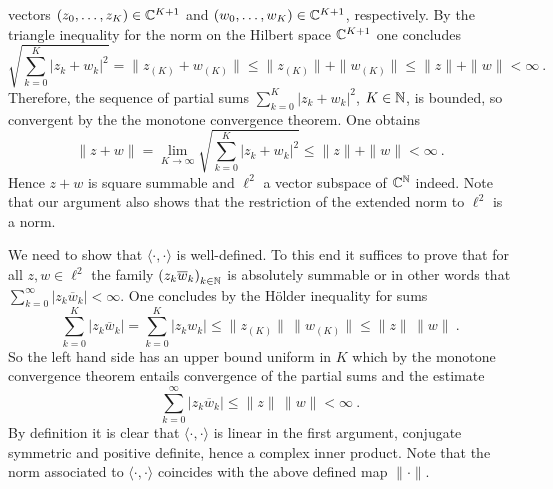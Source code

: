 \begin{examples}
\begin{environmentlist}
      vectors $(z_0, \ldots , z_K) \in \mathbb{C}^{K+1}$ and  $(w_0, \ldots , w_K) \in \mathbb{C}^{K+1}$, respectively. 
      By the triangle inequality for the norm on the Hilbert space $\mathbb{C}^{K+1}$  one concludes 
      \[
         \sqrt{\sum_{k=0}^K  | z_k + w_k |^2} =  \| z_{(K)} + w_{(K)} \| \leq 
         \| z_{(K)} \| + \| w_{(K)} \| \leq \| z \| + \| w \| < \infty \ .
      \] 
      Therefore, the sequence of partial sums $\sum_{k=0}^K  | z_k + w_k |^2$, $K\in \mathbb{N}$, is bounded,
      so convergent by the the monotone convergence theorem. One  obtains 
       \[
          \| z + w \| = \lim_{K\to\infty} \sqrt{ \sum_{k=0}^K  | z_k + w_k |^2} \leq \| z \| + \| w \| < \infty \ .
      \]
      Hence  $z + w$ is square summable and $\ell^2$ a vector subspace of $\mathbb{C}^{\mathbb{N}}$ indeed. 
      Note that our argument also shows that the restriction of the extended norm to $\ell^2$ is a norm. 

      We need to show that $\langle \cdot , \cdot \rangle$ is well-defined. 
      To this end it suffices to prove that for all $z,w \in\ell^2$ the family $\left( z_k \overline{w}_k\right)_{k\in \mathbb{N}}$ 
      is absolutely summable or in other words that $\sum_{k=0}^\infty \left| z_k \overline{w}_k \right| < \infty$. 
      One concludes by the H\"older inequality for  sums  
      \[
        \sum_{k=0}^K \left| z_k  \overline{w}_k \right| = \sum_{k=0}^K \left| z_k  w_k \right| 
        \leq \| z_{(K)} \| \,  \| w_{(K)} \| \leq  \| z \| \,  \| w \| \ .
      \]
      So the left hand side has an upper bound uniform in $K$ which by the monotone convergence theorem entails
      convergence of the partial sums and the estimate 
      \[
         \sum_{k=0}^\infty \left| z_k \overline{w}_k \right| \leq  \| z \| \,  \| w \| < \infty \ . 
      \] 
      By definition it is clear that $ \langle \cdot , \cdot \rangle $ is linear in the first argument, 
      conjugate symmetric and positive definite, hence a complex inner product. Note that the norm 
      associated to  $ \langle \cdot , \cdot \rangle $ coincides with the above defined map $\| \cdot \|$. 


\end{environmentlist}
\end{examples}

